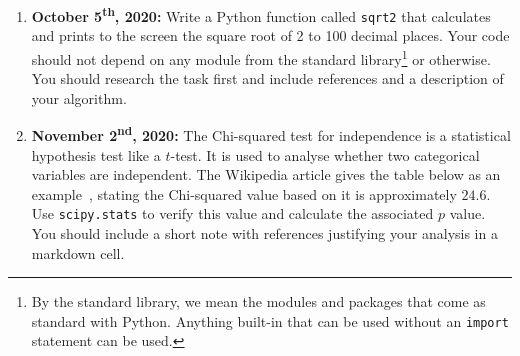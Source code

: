\documentclass[a4paper, 12pt]{scrartcl}
\begin{document}
    \begin{enumerate}
      \item
        \textbf{October 5\textsuperscript{th}, 2020:}
        Write a Python function called \texttt{sqrt2} that calculates and prints to the screen the square root of 2 to 100 decimal places.
        Your code should not depend on any module from the standard library\footnote{By the standard library, we mean the modules and packages that come as standard with Python. Anything built-in that can be used without an \texttt{import} statement can be used.} or otherwise.
        You should research the task first and include references and a description of your algorithm.
      \item
        \textbf{November 2\textsuperscript{nd}, 2020:}
        The Chi-squared test for independence is a statistical hypothesis test like a $t$-test. It is used to analyse whether two categorical variables are independent. The Wikipedia article gives the table below as an example~\cite{wikichisquare}, stating the Chi-squared value based on it is approximately $24.6$. Use \texttt{scipy.stats} to verify this value and calculate the associated $p$ value. You should include a short note with references justifying your analysis in a markdown cell.
        

\end{enumerate}
\end{document}
